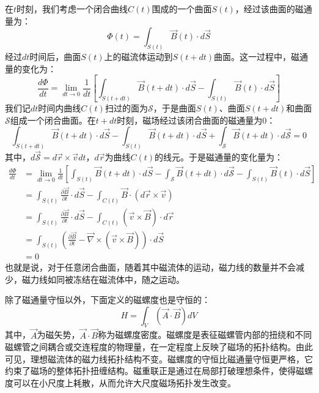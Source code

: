 \documentclass[lang=cn,color=blue,cm,11pt,scheme=chinese,bibend=bibtex,sorting=nty]{elegantbook}
\begin{document}
\begin{note}
		在$t$时刻，我们考虑一个闭合曲线$C(t)$围成的一个曲面$S(t)$，经过该曲面的磁通量为：
		\begin{equation}
			\Phi (t) = \int_{S (t)} \vec{B} (t) \cdot d \vec{S}
		\end{equation}
		经过$dt$时间后，曲面$S(t)$上的磁流体运动到$S(t+dt)$曲面。这一过程中，磁通量的变化为：
		\begin{equation}
			\frac{d \Phi}{d t} = \lim_{d t \rightarrow 0} \frac{1}{d t} \left[ \int_{S (t + d t)} \vec{B} (t + d t) \cdot d \vec{S} - \int_{S (t)} \vec{B} (t) \cdot d \vec{S} \right]
		\end{equation}
		我们记$dt$时间内曲线$C(t)$扫过的面为$\mathcal{S}$，于是曲面$S(t)$、曲面$S(t+dt)$和曲面$\mathcal{S}$组成一个闭合曲面。在$t+dt$时刻，磁场经过该闭合曲面的磁通量为0：
		\begin{equation}
			\int_{S (t + d t)} \vec{B} (t + d t) \cdot d \vec{S} - \int_{S (t)} \vec{B} (t + d t) \cdot d \vec{S} + \int_{\mathcal{S}} \vec{B} (t + d t) \cdot d \vec{\mathcal{S}} = 0
		\end{equation}
		其中，$d \vec{\mathcal{S}} = d \vec{r} \times \vec{v} dt$，$d\vec{r}$为曲线$C(t)$的线元。于是磁通量的变化量为：
		\begin{equation}
			\begin{aligned}
				\frac{d \Phi}{d t} & = \lim_{d t \rightarrow 0} \frac{1}{dt} \left[ \int_{S (t)} \vec{B} (t + d t) \cdot d \vec{S} - \int_{\mathcal{S}} \vec{B} (t + d t) \cdot d \vec{\mathcal{S}} - \int_{S (t)} \vec{B} (t) \cdot d \vec{S} \right] \\
				& = \int_{S (t)} \frac{\partial \vec{B}}{\partial t} \cdot d \vec{S} - \int_{C (t)} \vec{B} \cdot (d \vec{r} \times \vec{v})\\
				& = \int_{S (t)} \frac{\partial \vec{B}}{\partial t} \cdot d \vec{S} - \int_{C (t)} (\vec{v} \times \vec{B}) \cdot d \vec{r}\\
				& = \int_{S (t)} \left( \frac{\partial \vec{B}}{\partial t} - \vec{\nabla} \times (\vec{v} \times \vec{B}) \right) \cdot d \vec{S}\\
				& = 0
			\end{aligned}
		\end{equation}
		也就是说，对于任意闭合曲面，随着其中磁流体的运动，磁力线的数量并不会减少，磁力线如同被冻结在磁流体中，随之运动。
		
		除了磁通量守恒以外，下面定义的磁螺度也是守恒的：
		\begin{equation}
			H = \int_V (\vec{A} \cdot \vec{B}) d V
		\end{equation}
		其中，$\vec{A}$为磁矢势，$\vec{A} \cdot \vec{B}$称为磁螺度密度。磁螺度是表征磁螺管内部的扭绕和不同磁螺管之间耦合或交连程度的物理量，在一定程度上反映了磁场的拓扑结构。由此可见，理想磁流体的磁力线拓扑结构不变。磁螺度的守恒比磁通量守恒更严格，它约束了磁场的整体拓扑扭缠结构。磁重联正是通过在局部打破理想条件，使得磁螺度可以在小尺度上耗散，从而允许大尺度磁场拓扑发生改变。
	\end{note}
	
\end{document}
